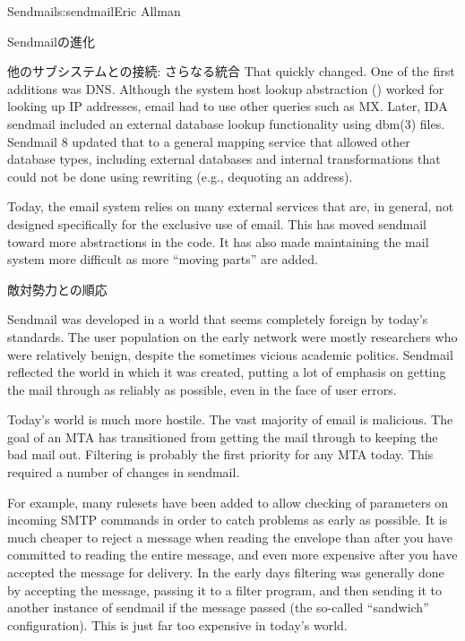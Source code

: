 \begin{aosachapter}{Sendmail}{s:sendmail}{Eric Allman}
\begin{aosasect1}{Sendmailの進化}
\begin{aosasect2}{他のサブシステムとの接続: さらなる統合}
That quickly changed. One of the first additions was DNS\@. Although the
system host lookup abstraction () worked for
looking up IP addresses, email had to use other queries such as
MX\@. Later, IDA sendmail included an external database lookup
functionality using dbm(3) files.  Sendmail 8 updated that to a
general mapping service that allowed other database types, including
external databases and internal transformations that could not be done
using rewriting (e.g., dequoting an address).

Today, the email system relies on many external services that are, in
general, not designed specifically for the exclusive use of email.
This has moved sendmail toward more abstractions in the code. It has
also made maintaining the mail system more difficult as more ``moving
parts'' are added.

\end{aosasect2}

\begin{aosasect2}{敵対勢力との順応}

Sendmail was developed in a world that seems completely foreign by
today's standards. The user population on the early network were
mostly researchers who were relatively benign, despite the sometimes
vicious academic politics.  Sendmail reflected the world in which it
was created, putting a lot of emphasis on getting the mail through as
reliably as possible, even in the face of user errors.

Today's world is much more hostile. The vast majority of email is
malicious. The goal of an MTA has transitioned from getting the mail
through to keeping the bad mail out. Filtering is probably the first
priority for any MTA today.  This required a number of changes in
sendmail.

For example, many rulesets have been added to allow checking of
parameters on incoming SMTP commands in order to catch problems as
early as possible. It is much cheaper to reject a message when reading
the envelope than after you have committed to reading the entire
message, and even more expensive after you have accepted the message
for delivery. In the early days filtering was generally done by
accepting the message, passing it to a filter program, and then
sending it to another instance of sendmail if the message passed (the
so-called ``sandwich'' configuration). This is just far too expensive
in today's world.


\end{aosasect2}
\end{aosasect1}
\end{aosachapter}
